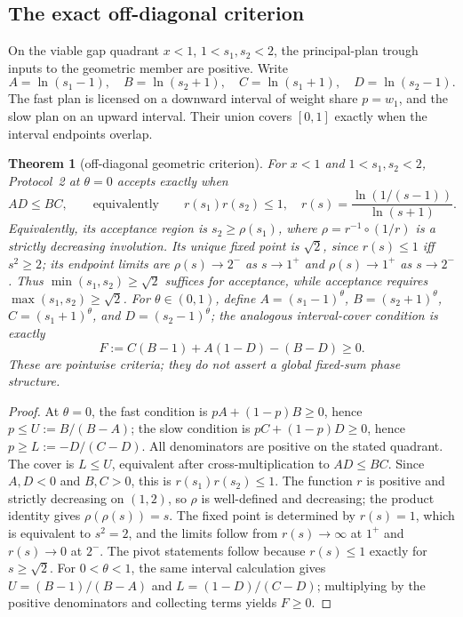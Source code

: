 \documentclass[preprint,11pt,authoryear]{elsarticle}
\newtheorem{theorem}{Theorem}
\theoremstyle{remark}
\begin{document}
\subsection{The exact off-diagonal criterion}

On the viable gap quadrant $x<1$, $1<s_1,s_2<2$, the principal-plan trough inputs to the geometric member are positive. Write
\[
A=\ln(s_1-1),\quad B=\ln(s_2+1),\quad C=\ln(s_1+1),\quad D=\ln(s_2-1).
\]
The fast plan is licensed on a downward interval of weight share $p=w_1$, and the slow plan on an upward interval. Their union covers $[0,1]$ exactly when the interval endpoints overlap.

\begin{theorem}[off-diagonal geometric criterion]\label{thm:offdiag}
For $x<1$ and $1<s_1,s_2<2$, Protocol~2 at $\theta=0$ accepts exactly when
\[
AD\le BC,\qquad\text{equivalently}\qquad r(s_1)r(s_2)\le1,
\quad r(s)=\frac{\ln(1/(s-1))}{\ln(s+1)}.
\]
Equivalently, its acceptance region is $s_2\ge\rho(s_1)$, where $\rho=r^{-1}\circ(1/r)$ is a strictly decreasing involution. Its unique fixed point is $\sqrt2$, since $r(s)\le1$ iff $s^2\ge2$; its endpoint limits are $\rho(s)\to2^-$ as $s\to1^+$ and $\rho(s)\to1^+$ as $s\to2^-$. Thus $\min(s_1,s_2)\ge\sqrt2$ suffices for acceptance, while acceptance requires $\max(s_1,s_2)\ge\sqrt2$. For $\theta\in(0,1)$, define $A=(s_1-1)^\theta$, $B=(s_2+1)^\theta$, $C=(s_1+1)^\theta$, and $D=(s_2-1)^\theta$; the analogous interval-cover condition is exactly
\[
F:=C(B-1)+A(1-D)-(B-D)\ge0.
\]
These are pointwise criteria; they do not assert a global fixed-sum phase structure.
\end{theorem}

\begin{proof}
At $\theta=0$, the fast condition is $pA+(1-p)B\ge0$, hence $p\le U:=B/(B-A)$; the slow condition is $pC+(1-p)D\ge0$, hence $p\ge L:=-D/(C-D)$. All denominators are positive on the stated quadrant. The cover is $L\le U$, equivalent after cross-multiplication to $AD\le BC$. Since $A,D<0$ and $B,C>0$, this is $r(s_1)r(s_2)\le1$. The function $r$ is positive and strictly decreasing on $(1,2)$, so $\rho$ is well-defined and decreasing; the product identity gives $\rho(\rho(s))=s$. The fixed point is determined by $r(s)=1$, which is equivalent to $s^2=2$, and the limits follow from $r(s)\to\infty$ at $1^+$ and $r(s)\to0$ at $2^-$. The pivot statements follow because $r(s)\le1$ exactly for $s\ge\sqrt2$. For $0<\theta<1$, the same interval calculation gives $U=(B-1)/(B-A)$ and $L=(1-D)/(C-D)$; multiplying by the positive denominators and collecting terms yields $F\ge0$.
\end{proof}
\end{document}
